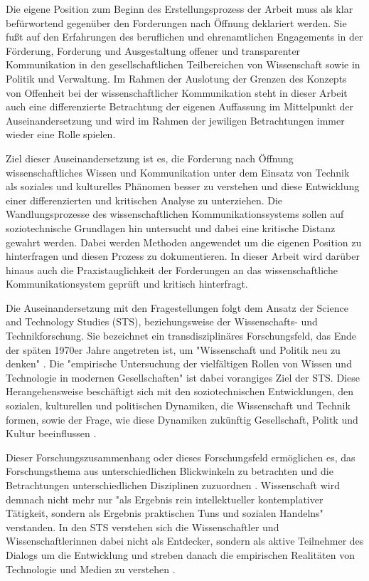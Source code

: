 Die eigene Position zum Beginn des Erstellungsprozess der Arbeit muss als klar befürwortend gegenüber den Forderungen nach Öffnung deklariert werden. Sie fußt auf den Erfahrungen des beruflichen und ehrenamtlichen Engagements in der Förderung, Forderung und Ausgestaltung offener und transparenter Kommunikation in den gesellschaftlichen Teilbereichen von Wissenschaft sowie in Politik und Verwaltung. Im Rahmen der Auslotung der Grenzen des Konzepts von Offenheit bei der wissenschaftlicher Kommunikation steht in dieser Arbeit auch eine differenzierte Betrachtung der eigenen Auffassung im Mittelpunkt der Auseinandersetzung und wird im Rahmen der jewiligen Betrachtungen immer wieder eine Rolle spielen.

Ziel dieser Auseinandersetzung ist es, die Forderung nach Öffnung wissenschaftliches Wissen und Kommunikation unter dem Einsatz von Technik als soziales und kulturelles Phänomen besser zu verstehen und diese Entwicklung einer differenzierten und kritischen Analyse zu unterziehen. Die Wandlungsprozesse des wissenschaftlichen Kommunikationssystems sollen auf soziotechnische Grundlagen hin untersucht und dabei eine kritische Distanz gewahrt werden. Dabei werden Methoden angewendet um die eigenen Position zu hinterfragen und diesen Prozess zu dokumentieren. In dieser Arbeit wird darüber hinaus auch die Praxistauglichkeit der Forderungen an das wissenschaftliche Kommunikationsystem geprüft und kritisch hinterfragt.

Die Auseinandersetzung mit den Fragestellungen folgt dem Ansatz der Science and Technology Studies (STS), beziehungsweise der Wissenschafts- und Technikforschung. Sie bezeichnet ein transdisziplinäres Forschungsfeld, das Ende der späten 1970er Jahre angetreten ist, um "Wissenschaft und Politik neu zu denken" \cite{Potthast_2010}. Die "empirische Untersuchung der vielfältigen Rollen von Wissen und Technologie in modernen Gesellschaften" \cite{beck_2014_science} ist dabei vorangiges Ziel der STS. Diese Herangehensweise beschäftigt sich mit den soziotechnischen Entwicklungen, den sozialen, kulturellen und politischen Dynamiken, die Wissenschaft und Technik formen, sowie der Frage, wie diese Dynamiken zukünftig Gesellschaft, Politk und Kultur beeinflussen \cite{Potthast_2010}.

Dieser Forschungszusammenhang oder dieses Forschungsfeld ermöglichen es, das Forschungsthema aus unterschiedlichen Blickwinkeln zu betrachten und die Betrachtungen unterschiedlichen Disziplinen zuzuordnen \cite{beck_2014_science}  \cite{Potthast_2010}. Wissenschaft wird demnach nicht mehr nur "als Ergebnis rein intellektueller kontemplativer Tätigkeit, sondern als Ergebnis praktischen Tuns und sozialen Handelns" \cite{beck_2014_science} verstanden. In den STS verstehen sich die Wissenschaftler und Wissenschaftlerinnen dabei nicht als Entdecker, sondern als aktive Teilnehmer des Dialogs um die Entwicklung \cite{MacKenzie_STS_1999} und streben danach die empirischen Realitäten von Technologie und Medien zu verstehen \cite{kelty_2014_freedom}.


